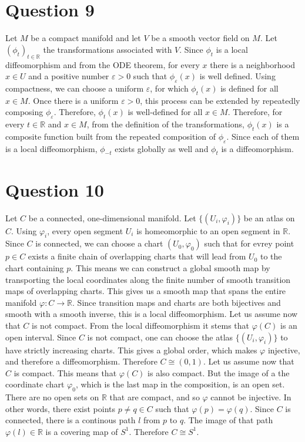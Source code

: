 \documentclass{article}
\newcommand{\R}{\ensuremath{\mathbb{R}}}
\begin{document}
\section*{Question 9}
Let $M$ be a compact manifold and let $V$ be a smooth vector field on $M$. Let $(\phi_t)_{t\in\R}$ the transformations associated with $V$.
Since $\phi_t$ is a local diffeomorphism and from the ODE theorem, for every $x$ there is a neighborhood $x \in U$ and a positive number $\varepsilon>0$ such that $\phi_\varepsilon(x)$ is well defined. Using compactness, we can choose a uniform $\varepsilon$, for which $\phi_t(x)$ is defined for all $x \in M$.
\newline
Once there is a uniform $\varepsilon > 0$, this process can be extended by repeatedly composing $\phi_\varepsilon$. Therefore, $\phi_t(x)$ is well-defined for all $x \in M$.
\newline
Therefore, for every $t \in \R$ and $x \in M$, from the definition of the transformations, $\phi_t(x)$ is a composite function built from the repeated composition of $\phi_{\varepsilon}$. Since each of them is a local diffeomorphism, $\phi_{-t}$ exists globally as well and $\phi_t$ is a diffeomorphism.

\section*{Question 10}
Let $C$ be a connected, one-dimensional manifold. Let $\{(U_i, \varphi_i)\}$ be an atlas on $C$. Using $\varphi_i$, every open segment $U_i$ is homeomorphic to an open segment in $\R$.
Since $C$ is connected, we can choose a chart $(U_0, \varphi_0)$ such that for evrey point $p \in C$ exists a finite chain of overlapping charts that will lead from $U_0$ to the chart containing $p$. This means we can construct a global smooth map by transporting the local coordinates along the finite number of smooth transition maps of overlapping charts. This gives us a smooth map that spans the entire manifold $\varphi: C \rightarrow \R$. Since transition maps and charts are both bijectives and smooth with a smooth inverse, this is a local diffeomorphism.
\newline
Let us assume now that $C$ is not compact. From the local diffeomorphism it stems that $\varphi(C)$ is an open interval. Since $C$ is not compact, one can choose the atlas $\{(U_i, \varphi_i)\}$ to have strictly increasing charts. This gives a global order, which makes $\varphi$ injective, and therefore a diffeomorphism. Therefore $C \cong (0,1)$.
\newline
Let us assume now that $C$ is compact. This means that $\varphi(C)$ is also compact. But the image of a the coordinate chart $\varphi_0$, which is the last map in the composition, is an open set. There are no open sets on $\R$ that are compact, and so $\varphi$ cannot be injective. In other words, there exist points $p \ne q \in C$ such that $\varphi(p) = \varphi(q)$. Since $C$ is connected, there is a continous path $l$ from $p$ to $q$. The image of that path $\varphi(l) \in \R$ is a covering map of $S^1$. Therefore $C \cong S^1$.
\end{document}
